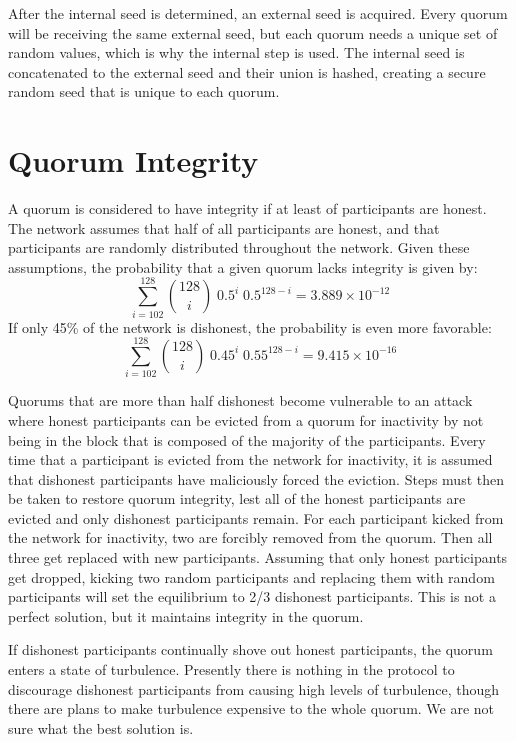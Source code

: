 \documentclass[twocolumn]{article}
\begin{document}
After the internal seed is determined, an external seed is acquired.
Every quorum will be receiving the same external seed, but each quorum needs a unique set of random values, which is why the internal step is used.
The internal seed is concatenated to the external seed and their union is hashed, creating a secure random seed that is unique to each quorum.

\section{Quorum Integrity}
A quorum is considered to have integrity if at least \integrity{} of participants are honest.
The network assumes that half of all participants are honest, and that participants are randomly distributed throughout the network.
Given these assumptions, the probability that a given quorum lacks integrity is given by:
\begin{equation}
\sum_{i=102}^{128} {128 \choose i} \; 0.5^{i} \; 0.5^{128-i} = 3.889\times10^{-12}
\end{equation}
If only 45\% of the network is dishonest, the probability is even more favorable:
\begin{equation}
\sum_{i=102}^{128} {128 \choose i} \; 0.45^{i} \; 0.55^{128-i} = 9.415\times10^{-16}
\end{equation}

Quorums that are more than half dishonest become vulnerable to an attack where honest participants can be evicted from a quorum for inactivity by not being in the block that is composed of the majority of the participants.
Every time that a participant is evicted from the network for inactivity, it is assumed that dishonest participants have maliciously forced the eviction.
Steps must then be taken to restore quorum integrity, lest all of the honest participants are evicted and only dishonest participants remain.
For each participant kicked from the network for inactivity, two are forcibly removed from the quorum.
Then all three get replaced with new participants.
Assuming that only honest participants get dropped, kicking two random participants and replacing them with random participants will set the equilibrium to 2/3 dishonest participants.
This is not a perfect solution, but it maintains integrity in the quorum.

If dishonest participants continually shove out honest participants, the quorum enters a state of turbulence.
Presently there is nothing in the protocol to discourage dishonest participants from causing high levels of turbulence, though there are plans to make turbulence expensive to the whole quorum.
We are not sure what the best solution is.
\end{document}
